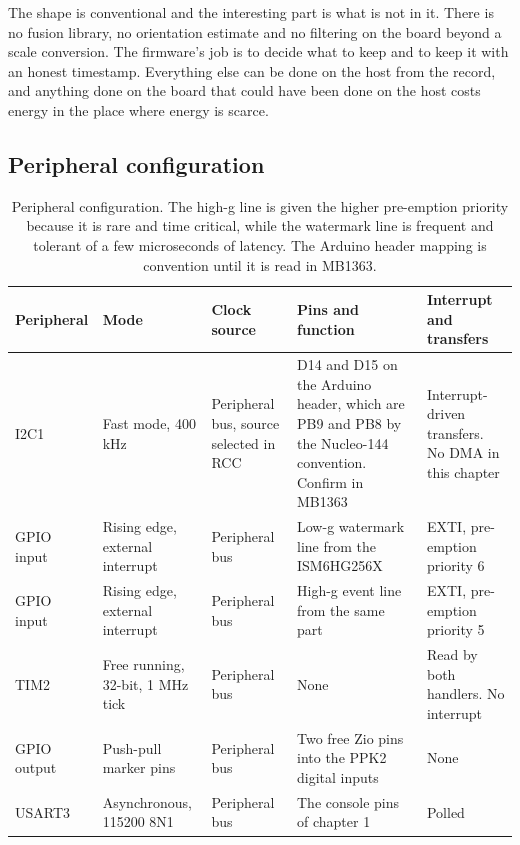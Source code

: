The shape is conventional and the interesting part is what is not in it. There
is no fusion library, no orientation estimate and no filtering on the board
beyond a scale conversion. The firmware's job is to decide what to keep and to
keep it with an honest timestamp. Everything else can be done on the host from
the record, and anything done on the board that could have been done on the host
costs energy in the place where energy is scarce.

\subsection*{Peripheral configuration}

\begin{table}[H]\centering\small
\begin{tabular}{p{22mm}p{26mm}p{24mm}p{30mm}p{30mm}}
\toprule
Peripheral & Mode & Clock source & Pins and function & Interrupt and transfers \\
\midrule
I2C1 & Fast mode, 400 kHz & Peripheral bus, source selected in RCC & D14 and D15 on the Arduino header, which are PB9 and PB8 by the Nucleo-144 convention. Confirm in MB1363 & Interrupt-driven transfers. No DMA in this chapter \\
GPIO input & Rising edge, external interrupt & Peripheral bus & Low-g watermark line from the ISM6HG256X & EXTI, pre-emption priority 6 \\
GPIO input & Rising edge, external interrupt & Peripheral bus & High-g event line from the same part & EXTI, pre-emption priority 5 \\
TIM2 & Free running, 32-bit, 1 MHz tick & Peripheral bus & None & Read by both handlers. No interrupt \\
GPIO output & Push-pull marker pins & Peripheral bus & Two free Zio pins into the PPK2 digital inputs & None \\
USART3 & Asynchronous, 115200 8N1 & Peripheral bus & The console pins of chapter 1 & Polled \\
\bottomrule
\end{tabular}
\caption{Peripheral configuration. The high-g line is given the higher pre-emption priority because it is rare and time critical, while the watermark line is frequent and tolerant of a few microseconds of latency. The Arduino header mapping is convention until it is read in MB1363.}
\end{table}

